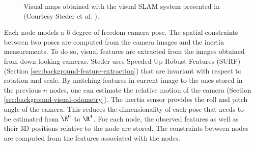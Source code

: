 \begin{figure}[htb!]
  \begin{center}
    \hspace{1cm}
   
  \end{center}
  \caption{Visual maps obtained with the visual SLAM system presented in \cite{steder2008visual} (Courtesy Steder et al. \cite{steder2008visual}).}
  \label{featureImg}
\end{figure}

Each node models a 6 degree of freedom camera pose.
The spatial constraints between two poses are computed from the camera images and the inertia measurements.
To do so, visual features are extracted from the images obtained from down-looking cameras.
Steder uses Speeded-Up Robust Features (SURF) (Section \ref{sec:background-feature-extraction}) that are invariant with respect to rotation and scale.
By matching features in current image to the ones stored in the previous $n$ nodes, one can estimate the relative motion of the camera (Section \ref{sec:background-visual-odometry}).
The inertia sensor provides the roll and pitch angle of the camera.
This reduces the dimensionality of each pose that needs to be estimated from $\R^6$ to $\R^4$.
For each node, the observed features as well as their 3D positions relative to the node are stored.
The constraints between nodes are computed from the features associated with the nodes.


